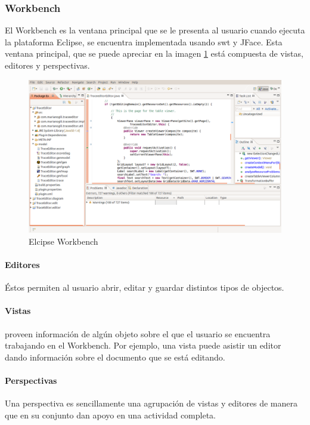 \documentclass[a4paper,12pt,oneside,spanish]{book}
\begin{document}
\subsubsection{Workbench}

El Workbench es la ventana principal que se le presenta al usuario cuando ejecuta la plataforma Eclipse, se encuentra implementada usando \gls{swt} y JFace. Esta ventana principal, que se puede apreciar en la imagen \ref{fig:EclipseWorkbench} está compuesta de vistas, editores y perspectivas.

\begin{figure}[hbtp]
\centering
\includegraphics[scale=0.3]{./img/EclipseWorkbench}
\caption{Elcipse Workbench}
\label{fig:EclipseWorkbench}
\end{figure}

\paragraph{Editores} Éstos permiten al usuario abrir, editar y guardar distintos tipos de objectos.

\paragraph{Vistas} proveen información de algún objeto sobre el que el usuario se encuentra trabajando en el Workbench. Por ejemplo, una vista puede asistir un editor dando información sobre el documento que se está editando.

\paragraph{Perspectivas} Una perspectiva es sencillamente una agrupación de vistas y editores de manera que en su conjunto dan apoyo en una actividad completa.
\end{document}
